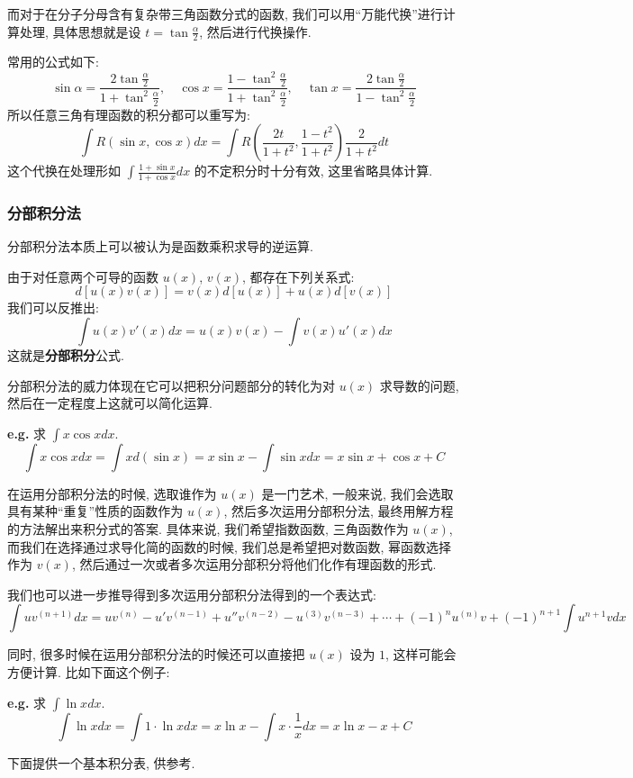 \documentclass[a4paper,12pt]{ctexart}
\begin{document}
而对于在分子分母含有复杂带三角函数分式的函数, 我们可以用“万能代换”进行计算处理, 具体思想就是设 $t = \tan \frac{\alpha}{2}$, 然后进行代换操作.

常用的公式如下:
$$
\sin \alpha = \frac{2 \tan \frac{\alpha}{2}}{1+\tan^2 \frac{\alpha}{2}}, \quad \cos x = \frac{1-\tan^2 \frac{\alpha}{2}}{1+\tan^2 \frac{\alpha}{2}}, \quad \tan x = \frac{2 \tan \frac{\alpha}{2}}{1-\tan^2 \frac{\alpha}{2}}
$$
所以任意三角有理函数的积分都可以重写为:
$$
\int R(\sin x, \cos x) dx = \int R\left(\frac{2t}{1+t^2},\frac{1-t^2}{1+t^2}\right) \frac{2}{1+t^2}dt
$$
这个代换在处理形如 $\int \frac{1+\sin x}{1+\cos x}dx$ 的不定积分时十分有效, 这里省略具体计算.

\subsubsection{分部积分法}

分部积分法本质上可以被认为是函数乘积求导的逆运算.

由于对任意两个可导的函数 $u(x)$, $v(x)$, 都存在下列关系式:
$$
d[u(x)v(x)] = v(x)d[u(x)]+u(x)d[v(x)]
$$
我们可以反推出:
$$
\int u(x)v'(x)dx = u(x)v(x)- \int v(x)u'(x)dx
$$
这就是\textbf{分部积分}公式.

分部积分法的威力体现在它可以把积分问题部分的转化为对 $u(x)$ 求导数的问题, 然后在一定程度上这就可以简化运算.

\noindent\textbf{e.g.} 求 $\int x \cos x dx$.
$$
\int x \cos x dx = \int x d(\sin x) = x \sin x - \int \sin x dx = x \sin x + \cos x +C
$$

在运用分部积分法的时候, 选取谁作为 $u(x)$ 是一门艺术, 一般来说, 我们会选取具有某种“重复”性质的函数作为 $u(x)$, 然后多次运用分部积分法, 最终用解方程的方法解出来积分式的答案. 具体来说, 我们希望指数函数, 三角函数作为 $u(x)$, 而我们在选择通过求导化简的函数的时候, 我们总是希望把对数函数, 幂函数选择作为 $v(x)$, 然后通过一次或者多次运用分部积分将他们化作有理函数的形式.

我们也可以进一步推导得到多次运用分部积分法得到的一个表达式:
$$
\int u v^{(n+1)} dx = u v^{(n)} - u'v^{(n-1)} +u''v^{(n-2)} - u^{(3)}v^{(n-3)} + \cdots + (-1)^n u^{(n)} v + (-1)^{n+1} \int u^{n+1} v dx
$$

同时, 很多时候在运用分部积分法的时候还可以直接把 $u(x)$ 设为 $1$, 这样可能会方便计算. 比如下面这个例子:

\noindent\textbf{e.g.} 求 $\int \ln x dx$.
$$
\int \ln x dx = \int 1 \cdot \ln x dx = x\ln x - \int x \cdot \frac{1}{x} dx =x\ln x - x +C
$$

下面提供一个基本积分表, 供参考.
\end{document}
